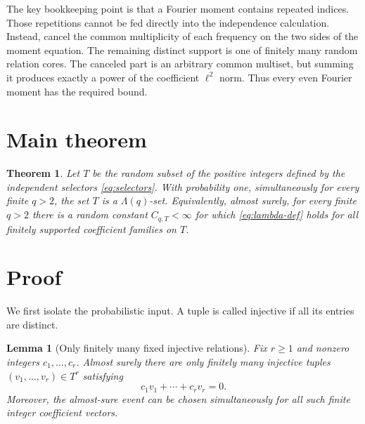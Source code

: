 \documentclass[11pt]{article}
\newtheorem{theorem}{Theorem}
\newtheorem{lemma}{Lemma}
\newcommand{\1}{\mathbf 1}
\begin{document}
The key bookkeeping point is that a Fourier moment contains repeated indices.
Those repetitions cannot be fed directly into the independence calculation.
Instead, cancel the common multiplicity of each frequency on the two sides of
the moment equation. The remaining distinct support is one of finitely many
random relation cores. The canceled part is an arbitrary common multiset, but
summing it produces exactly a power of the coefficient $\ell^2$ norm. Thus
every even Fourier moment has the required bound.

\section{Main theorem}

\begin{theorem}\label{thm:main}
Let $T$ be the random subset of the positive integers defined by the
independent selectors \eqref{eq:selectors}. With probability one, simultaneously
for every finite $q>2$, the set $T$ is a $\Lambda(q)$-set.
Equivalently, almost surely, for every finite $q>2$ there is a random constant
$C_{q,T}<\infty$ for which \eqref{eq:lambda-def} holds for all finitely
supported coefficient families on $T$.
\end{theorem}

\section{Proof}

We first isolate the probabilistic input. A tuple is called injective if all
its entries are distinct.

\begin{lemma}[Only finitely many fixed injective relations]\label{lem:cores}
Fix $r\geq1$ and nonzero integers $c_1,\ldots,c_r$. Almost surely there are
only finitely many injective tuples $(v_1,\ldots,v_r)\in T^r$ satisfying
\begin{equation}\label{eq:fixed-relation}
 c_1v_1+\cdots+c_rv_r=0.
\end{equation}
Moreover, the almost-sure event can be chosen simultaneously for all such
finite integer coefficient vectors.
\end{lemma}
\end{document}
